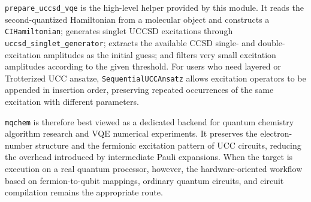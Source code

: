 \texttt{prepare\_uccsd\_vqe} is the high-level helper provided by this module. It reads the second-quantized Hamiltonian from a molecular object and constructs a \texttt{CIHamiltonian}; generates singlet UCCSD excitations through \texttt{uccsd\_singlet\_generator}; extracts the available CCSD single- and double-excitation amplitudes as the initial guess; and filters very small excitation amplitudes according to the given threshold. For users who need layered or Trotterized UCC ansatze, \texttt{SequentialUCCAnsatz} allows excitation operators to be appended in insertion order, preserving repeated occurrences of the same excitation with different parameters.

\texttt{mqchem} is therefore best viewed as a dedicated backend for quantum chemistry algorithm research and VQE numerical experiments. It preserves the electron-number structure and the fermionic excitation pattern of UCC circuits, reducing the overhead introduced by intermediate Pauli expansions. When the target is execution on a real quantum processor, however, the hardware-oriented workflow based on fermion-to-qubit mappings, ordinary quantum circuits, and circuit compilation remains the appropriate route.

